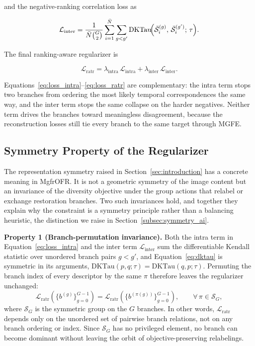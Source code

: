 \documentclass[symmetry,article,submit,pdftex,moreauthors]{Definitions/mdpi}
\begin{document}
and the negative-ranking correlation loss as

\begin{equation}
\mathcal{L}_{\text{inter}} =
\frac{1}{\bar{N} \binom{G}{2}}
\sum_{i=1}^{\bar{N}}
\sum_{g < g'}
\mathrm{DKTau}\!\Bigl(
\bar{\mathcal{S}}_i^{(g)},\,
\bar{\mathcal{S}}_i^{(g')};\,
\tau
\Bigr).
\end{equation}

The final ranking-aware regularizer is

\begin{equation}
\mathcal{L}_{\text{ratr}} =
\lambda_{\text{intra}}\,\mathcal{L}_{\text{intra}}
+ \lambda_{\text{inter}}\,\mathcal{L}_{\text{inter}}.
\label{eq:loss_ratr}
\end{equation}

Equations~\eqref{eq:loss_intra}--\eqref{eq:loss_ratr} are complementary: the intra term stops two branches from ordering the most likely temporal correspondences the same way, and the inter term stops the same collapse on the harder negatives. Neither term drives the branches toward meaningless disagreement, because the reconstruction losses still tie every branch to the same target through MGFE.

\subsection{Symmetry Property of the Regularizer}
\label{subsec:symmetry_property}

The representation symmetry raised in Section~\ref{sec:introduction} has a concrete meaning in MgfrOFR. It is not a geometric symmetry of the image content but an invariance of the diversity objective under the group actions that relabel or exchange restoration branches. Two such invariances hold, and together they explain why the constraint is a symmetry principle rather than a balancing heuristic, the distinction we raise in Section~\ref{subsec:symmetry_ai}.

\textbf{Property 1 (Branch-permutation invariance).} Both the intra term in Equation~\eqref{eq:loss_intra} and the inter term $\mathcal{L}_{\text{inter}}$ sum the differentiable Kendall statistic over unordered branch pairs $g<g'$, and Equation~\eqref{eq:dktau} is symmetric in its arguments, $\mathrm{DKTau}(p,q;\tau)=\mathrm{DKTau}(q,p;\tau)$. Permuting the branch index of every descriptor by the same $\pi$ therefore leaves the regularizer unchanged:
\begin{equation}
\mathcal{L}_{\text{ratr}}\!\left(\{b^{(g)}\}_{g=0}^{G-1}\right)
=
\mathcal{L}_{\text{ratr}}\!\left(\{b^{(\pi(g))}\}_{g=0}^{G-1}\right),
\qquad
\forall\,\pi\in\mathcal{S}_G,
\label{eq:branch_permutation}
\end{equation}
where $\mathcal{S}_G$ is the symmetric group on the $G$ branches. In other words, $\mathcal{L}_{\text{ratr}}$ depends only on the unordered set of pairwise branch relations, not on any branch ordering or index. Since $\mathcal{S}_G$ has no privileged element, no branch can become dominant without leaving the orbit of objective-preserving relabelings.
\end{document}
